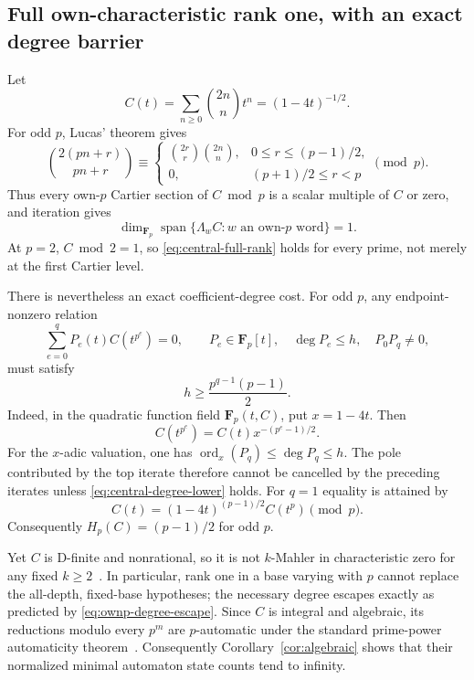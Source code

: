 \documentclass[11pt,reqno]{amsart}
\theoremstyle{definition}
\theoremstyle{remark}
\newcommand{\F}{\mathbf F}
\begin{document}
\subsection{Full own-characteristic rank one, with an exact degree barrier}
Let
\begin{equation}\label{eq:central}
 C(t)=\sum_{n\geq0}\binom{2n}{n}t^n=(1-4t)^{-1/2}.
\end{equation}
For odd $p$, Lucas' theorem gives
\[
 \binom{2(pn+r)}{pn+r}\equiv
 \begin{cases}
 \binom{2r}{r}\binom{2n}{n},&0\leq r\leq(p-1)/2,\\
 0,&(p+1)/2\leq r<p
 \end{cases}\pmod p.
\]
Thus every own-$p$ Cartier section of $C\bmod p$ is a scalar multiple of
$C$ or zero, and iteration gives
\begin{equation}\label{eq:central-full-rank}
 \dim_{\F_p}\operatorname{span}\{\Lambda_wC:w\text{ an own-$p$ word}\}=1.
\end{equation}
At $p=2$, $C\bmod2=1$, so \eqref{eq:central-full-rank} holds for every
prime, not merely at the first Cartier level.

There is nevertheless an exact coefficient-degree cost.  For odd $p$, any
endpoint-nonzero relation
\[
 \sum_{e=0}^{q}P_e(t)C(t^{p^e})=0,
 \qquad P_e\in\F_p[t],\quad \deg P_e\leq h,\quad P_0P_q\ne0,
\]
must satisfy
\begin{equation}\label{eq:central-degree-lower}
 h\geq\frac{p^{q-1}(p-1)}2.
\end{equation}
Indeed, in the quadratic function field $\F_p(t,C)$, put $x=1-4t$.
Then
\[
 C(t^{p^e})=C(t)x^{-(p^e-1)/2}.
\]
For the $x$-adic valuation, one has
$\operatorname{ord}_x(P_q)\leq\deg P_q\leq h$.  The pole contributed by
the top iterate therefore cannot be cancelled by the preceding iterates
unless \eqref{eq:central-degree-lower} holds.  For
$q=1$ equality is attained by
\begin{equation}\label{eq:central-sharp-relation}
 C(t)=(1-4t)^{(p-1)/2}C(t^p)\pmod p.
\end{equation}
Consequently $H_p(C)=(p-1)/2$ for odd $p$.

Yet $C$ is D-finite and nonrational, so it is not $k$-Mahler in
characteristic zero for any fixed $k\geq2$~\cite{bcr}.  In particular,
rank one in a base varying with $p$ cannot replace the all-depth,
fixed-base hypotheses; the necessary degree escapes exactly as predicted by
\eqref{eq:ownp-degree-escape}.  Since $C$ is integral and algebraic, its
reductions modulo every $p^m$ are $p$-automatic under the standard
prime-power automaticity theorem~\cite{profinite}.  Consequently
Corollary~\ref{cor:algebraic} shows that their normalized minimal automaton
state counts tend to infinity.
\end{document}
